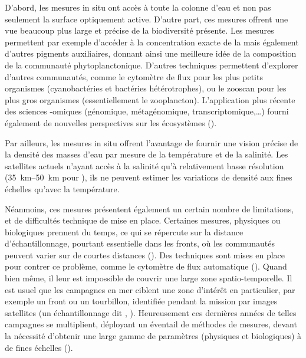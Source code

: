 D'abord, les mesures in situ ont accès à toute la colonne d'eau et non pas seulement la surface optiquement active.
D'autre part, ces mesures offrent une vue beaucoup plus large et précise de la biodiversité présente.
Les mesures  permettent par exemple d'accéder à la concentration exacte de la  mais également d'autres pigments auxiliaires, donnant ainsi une meilleure idée de la composition de la communauté phytoplanctonique.
D'autres techniques permettent d'explorer d'autres communautés, comme le cytomètre de flux pour les plus petits organismes (cyanobactéries et bactéries hétérotrophes), ou le zooscan pour les plus gros organismes (essentiellement le zooplancton).
L'application plus récente des sciences -omiques (génomique, métagénomique, transcriptomique,\dots) fourni également de nouvelles perspectives sur les écosystèmes (\cite{bork_2015,richter_2022,sunagawa_2020}).

Par ailleurs, les mesures in situ offrent l'avantage de fournir une vision précise de la densité des masses d'eau par mesure de la température et de la salinité.
Les satellites actuels n'ayant accès à la salinité qu'à relativement basse résolution (\qtyrange{35}{50}{\km} pour  ), ils ne peuvent estimer les variations de densité aux fines échelles qu'avec la température.

Néanmoins, ces mesures présentent également un certain nombre de limitations, et de difficultés technique de mise en place.
Certaines mesures, physiques ou biologiques  prennent du temps, ce qui se répercute sur la distance d’échantillonnage, pourtant essentielle dans les fronts, où les communautés peuvent varier sur de courtes distances (\cite{chekalyuk_2012,mangolte_2023}).
Des techniques sont mises en place pour contrer ce problème, comme le cytomètre de flux automatique (\cite{thyssen_2015}).
Quand bien même, il leur est impossible de couvrir une large zone spatio-temporelle.
Il est usuel que les campagnes en mer ciblent une zone d'intérêt en particulier, par exemple un front ou un tourbillon, identifiée pendant la mission par images satellites (un échantillonnage dit , \cite{marrec_2018,tzortzis_2021}).
Heureusement ces dernières années de telles campagnes se multiplient, déployant un éventail de méthodes de mesures, devant la nécessité d'obtenir une large gamme de paramètres (physiques et biologiques) à de fines échelles (\cite{shulman_2015,barcelo-llull_2021,marrec_2018,freilich_2021,tzortzis_2021,wilson_2021}).

